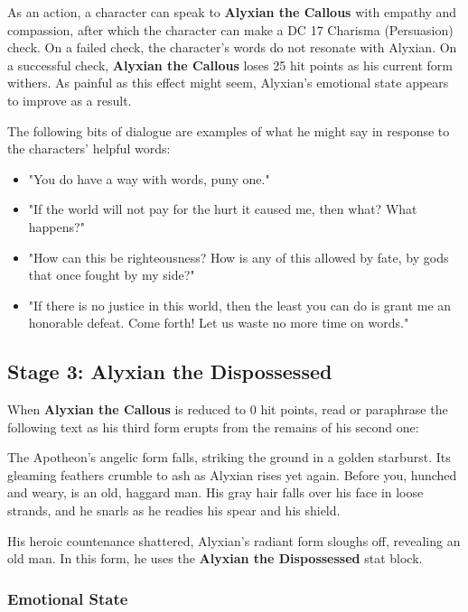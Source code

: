 \documentclass[letterpaper, 11pt, bg=full, twocolumn]{dndbook}
\begin{document}
As an action, a character can speak to \textbf{Alyxian the Callous} with empathy and compassion, after which the character can make a DC 17 Charisma (Persuasion) check. On a failed check, the character's words do not resonate with Alyxian. On a successful check, \textbf{Alyxian the Callous} loses 25 hit points as his current form withers. As painful as this effect might seem, Alyxian's emotional state appears to improve as a result.

The following bits of dialogue are examples of what he might say in response to the characters' helpful words:

\begin{itemize}
\item "You do have a way with words, puny one."
\item "If the world will not pay for the hurt it caused me, then what? What happens?"
\item "How can this be righteousness? How is any of this allowed by fate, by gods that once fought by my side?"
\item "If there is no justice in this world, then the least you can do is grant me an honorable defeat. Come forth! Let us waste no more time on words."
\end{itemize}

\subsection{Stage 3: Alyxian the Dispossessed}

When \textbf{Alyxian the Callous} is reduced to 0 hit points, read or paraphrase the following text as his third form erupts from the remains of his second one:

\begin{DndReadAloud}
The Apotheon's angelic form falls, striking the ground in a golden starburst. Its gleaming feathers crumble to ash as Alyxian rises yet again. Before you, hunched and weary, is an old, haggard man. His gray hair falls over his face in loose strands, and he snarls as he readies his spear and his shield.
\end{DndReadAloud}

His heroic countenance shattered, Alyxian's radiant form sloughs off, revealing an old man. In this form, he uses the \textbf{Alyxian the Dispossessed} stat block.


\subsubsection{Emotional State}
\end{document}
